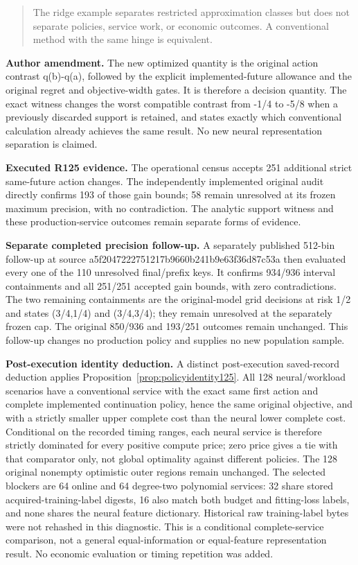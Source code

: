 \begin{quote}\small
The ridge example separates restricted approximation classes but does not separate policies, service work, or economic outcomes. A conventional method with the same hinge is equivalent.
\end{quote}

\noindent\textbf{Author amendment.} The new optimized quantity is the original action contrast q(b)-q(a), followed by the explicit implemented-future allowance and the original regret and objective-width gates. It is therefore a decision quantity. The exact witness changes the worst compatible contrast from -1/4 to -5/8 when a previously discarded support is retained, and states exactly which conventional calculation already achieves the same result. No new neural representation separation is claimed.

\noindent\textbf{Executed R125 evidence.} The operational census accepts 251 additional strict same-future action changes. The independently implemented original audit directly confirms 193 of those gain bounds; 58 remain unresolved at its frozen maximum precision, with no contradiction. The analytic support witness and these production-service outcomes remain separate forms of evidence.

\noindent\textbf{Separate completed precision follow-up.} A separately published 512-bin follow-up at source a5f2047222751217b9660b241b9e63f36d87c53a then evaluated every one of the 110 unresolved final/prefix keys. It confirms 934/936 interval containments and all 251/251 accepted gain bounds, with zero contradictions. The two remaining containments are the original-model grid decisions at risk 1/2 and states (3/4,1/4) and (3/4,3/4); they remain unresolved at the separately frozen cap. The original 850/936 and 193/251 outcomes remain unchanged. This follow-up changes no production policy and supplies no new population sample.

\noindent\textbf{Post-execution identity deduction.} A distinct post-execution saved-record deduction applies Proposition~\ref{prop:policyidentity125}. All 128 neural/workload scenarios have a conventional service with the exact same first action and complete implemented continuation policy, hence the same original objective, and with a strictly smaller upper complete cost than the neural lower complete cost. Conditional on the recorded timing ranges, each neural service is therefore strictly dominated for every positive compute price; zero price gives a tie with that comparator only, not global optimality against different policies. The 128 original nonempty optimistic outer regions remain unchanged. The selected blockers are 64 online and 64 degree-two polynomial services: 32 share stored acquired-training-label digests, 16 also match both budget and fitting-loss labels, and none shares the neural feature dictionary. Historical raw training-label bytes were not rehashed in this diagnostic. This is a conditional complete-service comparison, not a general equal-information or equal-feature representation result. No economic evaluation or timing repetition was added.

